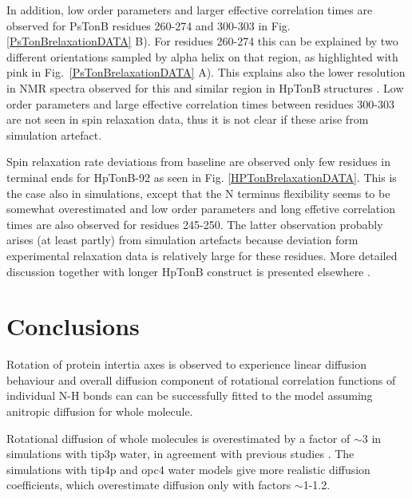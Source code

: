 \documentclass[pre,aps,floatfix,authordate1-4,twocolumn]{revtex4-1}
\begin{document}
In addition, low order parameters and larger effective correlation times
are observed for PsTonB residues 260-274 and 300-303
in Fig. \ref{PsTonBrelaxationDATA} B).
For residues 260-274 this can be explained by two different orientations
sampled by alpha helix on that region, as highlighted with pink
in Fig.~\ref{PsTonBrelaxationDATA} A). This explains also the
lower resolution in NMR spectra observed for this and similar region in
HpTonB structures \cite{??}. Low order parameters and large
effective correlation times between residues 300-303 are not seen
in spin relaxation data, thus it is not clear if these arise from
simulation artefact.

Spin relaxation rate deviations from baseline are observed only few residues in
terminal ends for HpTonB-92 as seen in Fig. \ref{HPTonBrelaxationDATA}.
This is the case also in simulations, except that
the N terminus flexibility seems to be somewhat overestimated and 
low order parameters and long effetive correlation times are also observed
for residues 245-250. The latter observation probably arises
(at least partly) from simulation artefacts because deviation form experimental
relaxation data is relatively large for these residues.
More detailed discussion together with longer HpTonB construct is
presented elsewhere \cite{??}.

\section{Conclusions}

Rotation of protein intertia axes is observed to experience linear
diffusion behaviour and overall diffusion component of rotational 
correlation functions of individual N-H bonds can can be successfully 
fitted to the model assuming anitropic diffusion for whole molecule.

Rotational diffusion of whole molecules is overestimated by a factor
of $\sim$3 in simulations with tip3p water, in agreement with previous
studies \cite{??}. The simulations with tip4p and opc4 water models
give more realistic diffusion coefficients, which overestimate diffusion
only with factors $\sim$1-1.2. 
\end{document}

